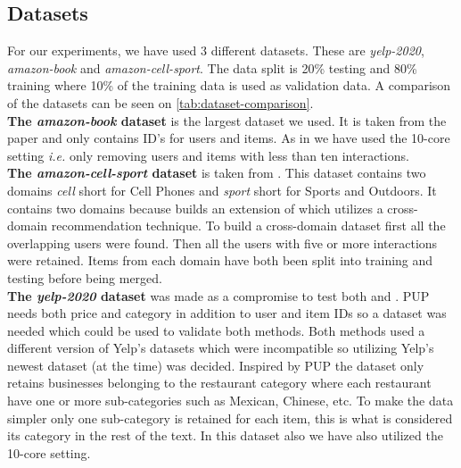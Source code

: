 \subsection{Datasets}
For our experiments, we have used 3 different datasets.
These are \textit{yelp-2020}, \textit{amazon-book} and \textit{amazon-cell-sport}.
The data split is 20\% testing and 80\% training where 10\% of the training data is used as validation data.
A comparison of the datasets can be seen on \autoref{tab:dataset-comparison}.
\\
\textbf{The \textit{amazon-book} dataset} is the largest dataset we used.
It is taken from the \cite{lightgcn} paper and only contains ID's for users and items.
As in \cite{lightgcn} we have used the 10-core setting \textit{i.e.} only removing users and items with less than ten interactions.
\\
\textbf{The \textit{amazon-cell-sport} dataset} is taken from \cite{BiTGCF}.
This dataset contains two domains \textit{cell} short for Cell Phones and \textit{sport} short for Sports and Outdoors.
It contains two domains because \cite{BiTGCF} builds an extension of \cite{lightgcn} which utilizes a cross-domain recommendation technique.
To build a cross-domain dataset first all the overlapping users were found.
Then all the users with five or more interactions were retained.
Items from each domain have both been split into training and testing before being merged.
\\
\textbf{The \textit{yelp-2020} dataset} was made as a compromise to test both \cite{lightgcn} and \cite{PUP}.
PUP needs both price and category in addition to user and item IDs so a dataset was needed which could be used to validate both methods.
Both methods used a different version of Yelp's datasets which were incompatible so utilizing Yelp's newest dataset (at the time) was decided.
Inspired by PUP the dataset only retains businesses belonging to the restaurant category where each restaurant have one or more sub-categories such as Mexican, Chinese, etc.
To make the data simpler only one sub-category is retained for each item, this is what is considered its category in the rest of the text.
In this dataset also we have also utilized the 10-core setting.


